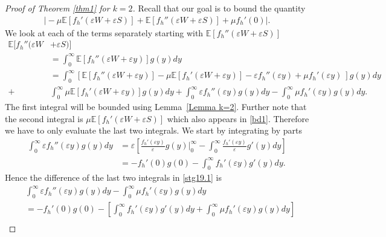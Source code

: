 \documentclass[11pt,letterpaper,reqno]{article}
\theoremstyle{thmstyleone}%
\theoremstyle{thmstyletwo}%
\theoremstyle{thmstylethree}%
\numberwithin{equation}{section}
\begin{document}
\begin{proof}[Proof of Theorem \ref{thm1} for $k=2$]
Recall that our goal is to bound the quantity
\begin{align}\label{bd1}
    \bigg|-\mu \mathbb E[f_h'(\varepsilon W+\varepsilon S)]+ \mathbb E[f_h''(\varepsilon W+\varepsilon S)]+\mu f_h'(0)\bigg|.
\end{align}
We look at each of the terms separately starting with $ \mathbb E[f_h''(\varepsilon W+\varepsilon S)]$
\begin{align}\label{stg19.1}
\nonumber    \mathbb E[f_h''(\varepsilon W &+ \varepsilon S)]\\
\nonumber &=\int_0^\infty \mathbb E[f_h''(\varepsilon W+\varepsilon y)]g(y)dy\\ \nonumber
&=\int_0^\infty \left[\mathbb E[f_h''(\varepsilon W+\varepsilon y)]-\mu \mathbb E[f_h'(\varepsilon W+\varepsilon y)]-\varepsilon f_h''(\varepsilon y)
     +\mu f_h'(\varepsilon y)\ \right] g(y)dy\\ 
   +&\int_0^\infty\mu \mathbb E[f_h'(\varepsilon W+\varepsilon y)]g(y)dy+\int_0^\infty\varepsilon f_h''(\varepsilon y)g(y)dy-\int_0^\infty \mu f_h'(\varepsilon y)g(y)dy .
\end{align}
The first integral will be bounded using Lemma~\ref{Lemma k=2}. Further note that the second integral is  $\mu \mathbb E[f_h'(\varepsilon W+\varepsilon S)]$ which also appears in \eqref{bd1}. Therefore we have to only evaluate the last two integrals. We start by integrating by parts
\begin{align*}
    \int_0^\infty\varepsilon f_h''(\varepsilon y)g(y)dy&=\varepsilon \left[ \frac{f_h'(\varepsilon y)}{\varepsilon}g(y)\bigg|_0^\infty-\int_0^\infty \frac{f_h'(\varepsilon y)}{\varepsilon }g'(y)dy\right]\\
    &=- f_h'(0)g(0)-\int_0^\infty f_h'(\varepsilon y)g'(y)dy.
\end{align*}
Hence the difference of the last two integrals in \eqref{stg19.1} is 
\begin{align}\label{stg20.1}
& \int_0^\infty\varepsilon f_h''(\varepsilon y)g(y)dy-\int_0^\infty \mu f_h'(\varepsilon y)g(y)dy \nonumber \\
&=- f_h'(0)g(0)-\left[\int_0^\infty f_h'(\varepsilon y)g'(y)dy+\int_0^\infty \mu f_h'(\varepsilon y)g(y)dy\right]\nonumber\\

\end{align}
\end{proof}
\end{document}
